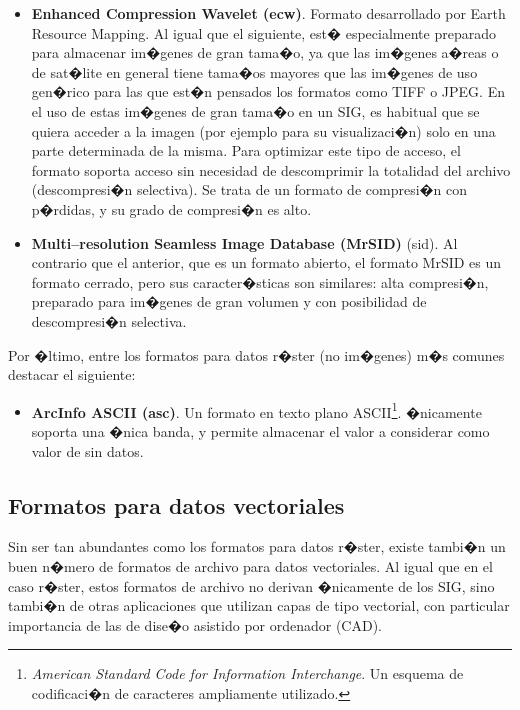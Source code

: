 \begin{itemize}
	\item \textbf{Enhanced Compression Wavelet (ecw)}. Formato desarrollado por Earth Resource Mapping. Al igual que el siguiente, est� especialmente preparado para almacenar im�genes de gran tama�o, ya que las im�genes a�reas o de sat�lite en general tiene tama�os mayores que las im�genes de uso gen�rico para las que est�n pensados los formatos como TIFF o JPEG. 
	En el uso de estas im�genes de gran tama�o en un SIG, es habitual que se quiera acceder a la imagen (por ejemplo para su visualizaci�n) solo en una parte determinada de la misma. Para optimizar este tipo de acceso, el formato soporta acceso sin necesidad de descomprimir la totalidad del archivo (descompresi�n selectiva).
	Se trata de un formato de compresi�n con p�rdidas, y su grado de compresi�n es alto. 
	\item \textbf{Multi--resolution Seamless Image Database (MrSID)} (sid). Al contrario que el anterior, que es un formato abierto, el formato MrSID es un formato cerrado, pero sus caracter�sticas son similares: alta compresi�n, preparado para im�genes de gran volumen y con posibilidad de descompresi�n selectiva.
\end{itemize}

Por �ltimo, entre los formatos para datos r�ster (no im�genes) m�s comunes destacar el siguiente:

\begin{itemize}
	\item \textbf{ArcInfo ASCII (asc)}. Un formato en texto plano ASCII\footnote{\emph{American Standard Code for Information Interchange}. Un esquema de codificaci�n de caracteres ampliamente utilizado.}. �nicamente soporta una �nica banda, y permite almacenar el valor a considerar como valor de sin datos.
\end{itemize}

\subsection{Formatos para datos vectoriales}

Sin ser tan abundantes como los formatos para datos r�ster, existe tambi�n un buen n�mero de formatos de archivo para datos vectoriales. Al igual que en el caso r�ster, estos formatos de archivo no derivan �nicamente de los SIG, sino tambi�n de otras aplicaciones que utilizan capas de tipo vectorial, con  particular importancia de las de dise�o asistido por ordenador (CAD).

